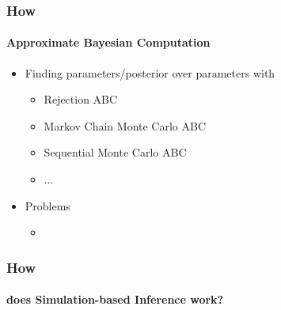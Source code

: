 \documentclass[9pt]{beamer}
\begin{document}
\begin{frame}
\frametitle{How}
\framesubtitle{Approximate Bayesian Computation}
\begin{itemize}
	\item Finding parameters/posterior over parameters with
	\begin{itemize}
		\item Rejection ABC
		\item Markov Chain Monte Carlo ABC
		\item Sequential Monte Carlo ABC
		\item ...
	\end{itemize}
	\item Problems
	\begin{itemize}
		\item 
	\end{itemize}
\end{itemize}
\end{frame} 






\begin{frame}
\frametitle{How}
\framesubtitle{does Simulation-based Inference work?}
\begin{figure}
\end{figure}
\end{frame} 
\end{document}
